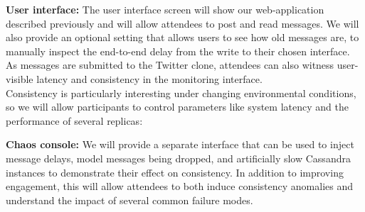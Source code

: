 \textbf{User interface:} The user interface screen will show our
web-application described previously and will allow attendees to post
and read messages. We will also provide an optional setting that
allows users to see how old messages are, to manually inspect the
end-to-end delay from the write to their chosen interface. As messages
are submitted to the Twitter clone, attendees can also witness
user-visible latency and consistency in the monitoring interface.\\[-.5em]

Consistency is particularly interesting under changing environmental
conditions, so we will allow participants to control parameters like
system latency and the performance of several replicas:

\textbf{Chaos console:} We will provide a separate interface that can
be used to inject message delays, model messages being dropped, and
artificially slow Cassandra instances to demonstrate their effect on
consistency. In addition to improving engagement, this will allow
attendees to both induce consistency anomalies and understand the
impact of several common failure modes.


